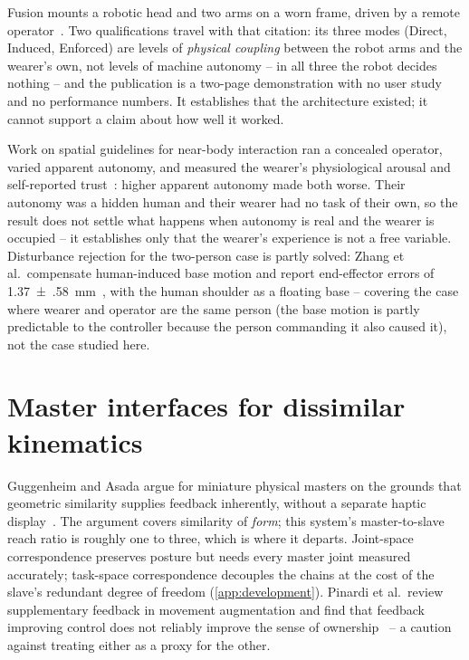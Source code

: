 Fusion mounts a robotic head and two arms on a worn frame, driven by a
remote operator~\cite{saraiji2018fusion}. Two qualifications travel with
that citation: its three modes (Direct, Induced, Enforced) are levels of
\emph{physical coupling} between the robot arms and the wearer's own, not
levels of machine autonomy -- in all three the robot decides nothing -- and
the publication is a two-page demonstration with no user study and no
performance numbers. It establishes that the architecture existed; it
cannot support a claim about how well it worked.

Work on spatial guidelines for near-body interaction ran a concealed
operator, varied apparent autonomy, and measured the wearer's physiological
arousal and self-reported trust~\cite{zhou2026proxemics}: higher apparent
autonomy made both worse. Their autonomy was a hidden human and their wearer
had no task of their own, so the result does not settle what happens when
autonomy is real and the wearer is occupied -- it establishes only that the
wearer's experience is not a free variable. Disturbance rejection for the
two-person case is partly solved: Zhang et al.\ compensate human-induced
base motion and report end-effector errors of
\SI{1.37(58)}{\milli\metre}~\cite{zhang2024motioncomp}, with the human
shoulder as a floating base -- covering the case where wearer and operator
are the same person (the base motion is partly predictable to the
controller because the person commanding it also caused it), not the case
studied here.

\section{Master interfaces for dissimilar kinematics}

Guggenheim and Asada argue for miniature physical masters on the grounds
that geometric similarity supplies feedback inherently, without a separate
haptic display~\cite{guggenheim2021haptic}. The argument covers similarity
of \emph{form}; this system's master-to-slave reach ratio is roughly one to
three, which is where it departs. Joint-space correspondence preserves
posture but needs every master joint measured accurately; task-space
correspondence decouples the chains at the cost of the slave's redundant
degree of freedom (\cref{app:development}). Pinardi et al.\ review
supplementary feedback in movement augmentation and find that feedback
improving control does not reliably improve the sense of
ownership~\cite{pinardi2023feedback} -- a caution against treating either as
a proxy for the other.


